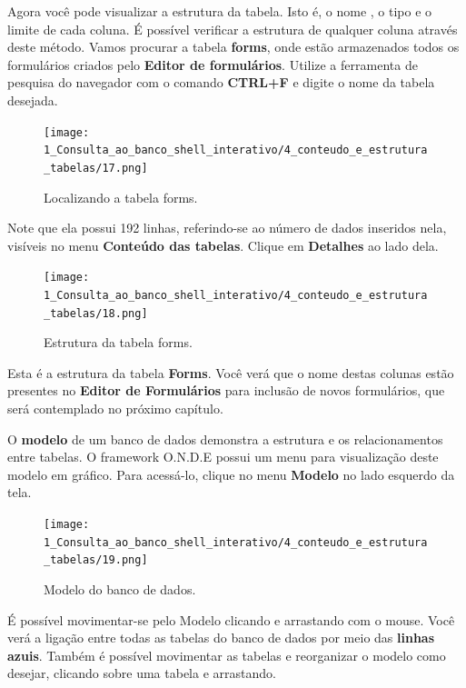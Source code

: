 \documentclass[9pt]{report}
\begin{document}
{    Agora você pode visualizar a estrutura da tabela. Isto é, o nome
    , o tipo e o limite de cada coluna. É possível verificar a
    estrutura de qualquer coluna através deste método. Vamos procurar
    a tabela  \textbf{forms}, onde estão armazenados todos os
    formulários criados pelo  \textbf{Editor de formulários}. Utilize
    a ferramenta de pesquisa do navegador com o comando
    \textbf{CTRL+F} e digite o nome da tabela desejada.

     \begin{figure}[H]
     \texttt{[image: 1\_Consulta\_ao\_banco\_shell\_interativo/4\_conteudo\_e\_estrutura\_tabelas/17.png]}
     \label{fig:festruturaforms}
     \caption{Localizando a tabela forms.}
    \end{figure}

     Note que ela possui 192 linhas, referindo-se ao número de dados
     inseridos nela, visíveis no menu \textbf{Conteúdo das tabelas}.
     Clique em \textbf{Detalhes} ao lado dela.

     \begin{figure}[H]
     \texttt{[image: 1\_Consulta\_ao\_banco\_shell\_interativo/4\_conteudo\_e\_estrutura\_tabelas/18.png]}
     \caption{Estrutura da tabela forms.}
     \label{fig:estruturaforms}
     \end{figure}
     
     Esta é a estrutura da tabela \textbf{Forms}. Você verá que o
     nome destas colunas estão presentes no \textbf{Editor de
       Formulários} para inclusão de novos formulários, que será
     contemplado no próximo capítulo.

     O \textbf{modelo} de um banco de dados demonstra a estrutura e
     os relacionamentos entre tabelas. O framework O.N.D.E possui um
     menu para visualização deste modelo em gráfico. Para acessá-lo,
     clique no menu \textbf{Modelo} no lado esquerdo da tela.

      \begin{figure}[H]
     \texttt{[image: 1\_Consulta\_ao\_banco\_shell\_interativo/4\_conteudo\_e\_estrutura\_tabelas/19.png]}
     \caption{Modelo do banco de dados.}
     \label{fig.modelo}
     \end{figure}

      É possível movimentar-se pelo Modelo clicando e arrastando com
      o mouse. Você verá a ligação entre todas as tabelas do banco
      de dados por meio das \textbf{linhas azuis}. Também é possível
      movimentar as tabelas e reorganizar o modelo como desejar,
      clicando sobre uma tabela e arrastando.

}
\end{document}
